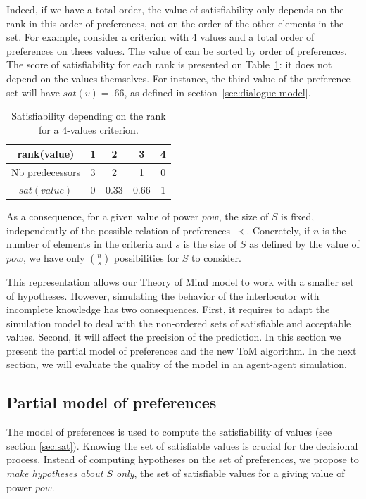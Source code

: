 \documentclass[sigconf]{aamas}  %
\begin{document}
	Indeed, if we have a total order, the value of satisfiability only depends on the rank in this order of preferences, not on the order of the other elements in the set. For example, consider a criterion with 4 values and a total order of preferences on thees values. The value of can be sorted by order of preferences. The score of satisfiability for each rank is presented on Table~\ref{tab:poss}: it does not depend on the values themselves. For instance, the third value of the preference set will have $sat(v)=.66$, as defined in section~\ref{sec:dialogue-model}.
	\begin{table}[h]
		\caption{Satisfiability depending on the rank for a 4-values criterion.}
		\label{tab:poss}
		\centering
		\begin{tabular}{ |c|c|c|c|c| }
			\hline				
			rank(value) & 1 & 2 & 3 & 4 \\
			\hline
			Nb predecessors & 3 & 2 & 1& 0 \\
			\hline
			$sat(value)$ & 0 & 0.33 & 0.66 &1 \\
			\hline
		\end{tabular}
	\end{table}
	
	As a consequence, for a given value of power $pow$, the size of $S$ is fixed, independently of the possible relation of preferences $\prec$. Concretely, if $n$ is the number of elements in the criteria and $s$ is the size of $S$ as defined by the value of $pow$, we have only $\binom{n}{s}$ possibilities for $S$ to consider.
	
	This representation allows our Theory of Mind model to work with a smaller set of hypotheses. However, simulating the behavior of the interlocutor with incomplete knowledge has two consequences. First, it requires to adapt the simulation model to deal with the non-ordered sets of satisfiable and acceptable values. Second, it will affect the precision of the prediction. In this section we present the partial model of preferences and the new ToM algorithm. In the next section, we will evaluate the quality of the model in an agent-agent simulation.
	
	\subsection{Partial model of preferences}
	
	The model of preferences is used to compute the satisfiability of values (see section \ref{sec:sat}). Knowing the set of satisfiable values is crucial for the decisional process. Instead of computing hypotheses on the set of preferences, we propose to \emph{make hypotheses about $S$ only}, the set of satisfiable values for a giving value of power $pow$.  
	
\end{document}
